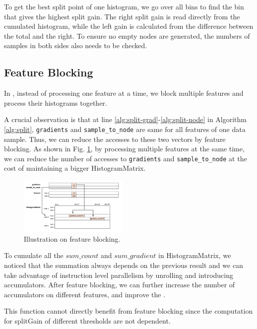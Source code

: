 \mypar{\getbestsplit}
To get the best split point of one histogram, we go over all bins to find the bin that gives the highest split gain. The right split gain is read directly from the cumulated histogram, while the left gain is calculated from the difference between the total and the right. To ensure no empty nodes are generated, the numbers of samples in both sides also needs to be checked.

\subsection{Feature Blocking}
In \findbestsplit, instead of processing one feature at a time, we block multiple features and process their histograms together.

\mypar{\update}
A crucial observation is that at line \ref{alg:split-grad}-\ref{alg:split-node} in Algorithm \ref{alg:split}, \texttt{gradients} and \texttt{sample\_to\_node} are same for all features of one data sample. 
Thus, we can reduce the accesses to these two vectors by feature blocking. As shown in Fig. \ref{fig:fb}, by processing multiple features at the same time, we can reduce the number of accesses to \texttt{gradients} and \texttt{sample\_to\_node} at the cost of maintaining a bigger HistogramMatrix. 


\begin{figure}[h]
  \includegraphics[width=0.47\textwidth]{fig/fig_fb.png}
  \caption{Illustration on feature blocking.}
  \label{fig:fb}
\end{figure}

\mypar{\cumulate}
To cumulate all the $sum\_count$ and $sum\_gradient$ in HistogramMatrix, we noticed that the summation always depends on the previous result and we can take advantage of instruction level parallelism by unrolling and introducing accumulators.
After feature blocking, we can further increase the number of accumulators on different features, and improve the \cumulate.

\mypar{\getbestsplit}
This function cannot directly benefit from feature blocking since the computation for splitGain of different thresholds are not dependent.

